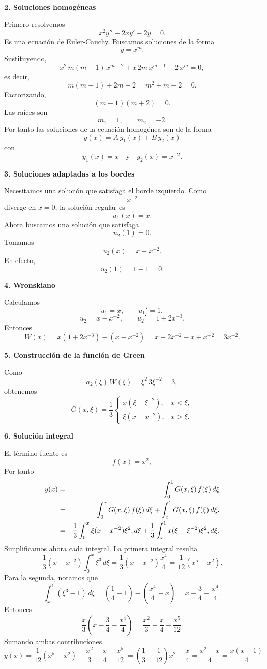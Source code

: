 \documentclass[11pt,spanish]{article}
\begin{document}
{\bf 2. Soluciones homogéneas}

Primero resolvemos
$$
x^2y''+2xy'-2y=0.
$$
Es una ecuación de Euler-Cauchy.
Buscamos soluciones de la forma
$$
y=x^m.
$$
Sustituyendo,
$$
x^2\,m(m-1)\,x^{m-2}+x\,2m\,x^{m-1}-2\,x^m=0,
$$
es decir,
$$
m(m-1)+2m-2
=
m^2+m-2
=
0.
$$
Factorizando,
$$
(m-1)(m+2)=0.
$$
Las raíces son
$$
m_1=1,
\qquad
m_2=-2.
$$
Por tanto las soluciones de la ecuación homog\'enea son de la forma
$$
y(x)=A\,y_1(x)+B\,y_2(x)
$$
con
$$
y_1(x) = x
\quad
\text{y}
\quad
y_2(x) = x^{-2}.
$$

{\bf 3. Soluciones adaptadas a los bordes}

Necesitamos una solución que satisfaga el borde izquierdo.
Como
$$
x^{-2}
$$
diverge en $x=0$, la solución regular es
$$
u_1(x)=x.
$$
Ahora buscamos una solución que satisfaga
$$
u_2(1)=0.
$$
Tomamos
$$
u_2(x)=x-x^{-2}.
$$
En efecto,
$$
u_2(1)=1-1=0.
$$

{\bf 4. Wronskiano}

Calculamos
$$
u_1=x,
\qquad
u_1'=1,
$$
$$
u_2=x-x^{-2},
\qquad
u_2'=1+2x^{-3}.
$$
Entonces
$$
W(x)
=
x(1+2x^{-3})
-(x-x^{-2})
=
x+2x^{-2}-x+x^{-2}
=
3x^{-2}.
$$

{\bf 5. Construcción de la función de Green}

Como
$$
a_2(\xi)\,W(\xi) = \xi^2\,3\xi^{-2} = 3,
$$
obtenemos
$$
\boxed{
G(x,\xi)
=
\frac{1}{3}
\begin{cases}
x(\xi-\xi^{-2}),
&
x<\xi,\\
\xi(x-x^{-2}),
&
x>\xi.
\end{cases}
}
$$

{\bf 6. Solución integral}

El término fuente es
$$
f(x)=x^2,
$$
Por tanto
\begin{eqnarray}
y(x)
&=&
\int_0^1
G(x,\xi)\,f(\xi)\,d\xi
\notag
\\
&=&
\int_0^x
G(x,\xi)\,f(\xi)\,d\xi
+
\int_x^1
G(x,\xi)\,f(\xi)\,d\xi.
\notag
\\
&=&
\frac13
\int_0^x
\xi(x-x^{-2})\xi^2,d\xi
+
\frac13
\int_x^1
x(\xi-\xi^{-2})\xi^2,d\xi.
\notag
\end{eqnarray}
Simplificamos ahora cada integral.
La primera integral resulta
$$
\frac13(x-x^{-2})
\int_0^x\xi^3\,d\xi
=
\frac13(x-x^{-2})\frac{x^4}{4}
=
\frac1{12}(x^5-x^2).
$$
Para la segunda, notamos que
$$
\int_x^1(\xi^3-1)\,d\xi
=
\left(\frac14-1\right)
-
\left(\frac{x^4}{4}-x\right)
=
x-\frac34-\frac{x^4}{4}.
$$
Entonces
$$
\frac{x}{3}
\left(
x-\frac34-\frac{x^4}{4}
\right)
=
\frac{x^2}{3}
-\frac{x}{4}
-\frac{x^5}{12}.
$$
Sumando ambas contribuciones
$$
y(x)
=
\frac1{12}(x^5-x^2)
+
\frac{x^2}{3}
-\frac{x}{4}
-\frac{x^5}{12} \
=
\left(\frac13-\frac1{12}\right)x^2
-\frac{x}{4}
=
\frac{x^2-x}{4}
=
\frac{x(x-1)}{4}
$$
\end{document}
